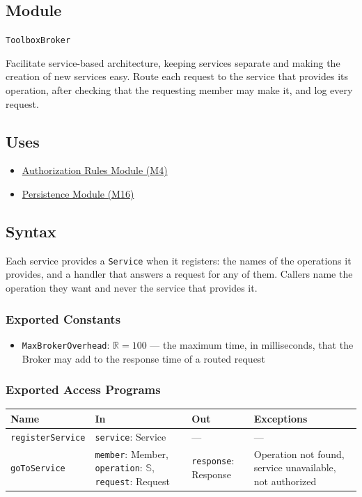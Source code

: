 \documentclass[12pt, titlepage]{article}
\begin{document}
\subsection{Module}
\texttt{ToolboxBroker}

Facilitate service-based architecture, keeping services separate and making the creation of new services easy. Route each request to the service that provides its operation, after checking that the requesting member may make it, and log every request.

\subsection{Uses}
\begin{itemize}
  \item \hyperref[mAuthz]{Authorization Rules Module (M4)}
  \item \hyperref[mPersist]{Persistence Module (M16)}
\end{itemize}

\subsection{Syntax}
Each service provides a \texttt{Service} when it registers: the names of the operations it provides, and a handler that answers a request for any of them. Callers name the operation they want and never the service that provides it.

\subsubsection{Exported Constants}
\begin{itemize}
  \item \texttt{MaxBrokerOverhead}: $\mathbb{R} = 100$ --- the maximum time, in milliseconds, that the Broker may add to the response time of a routed request
\end{itemize}

\subsubsection{Exported Access Programs}
\begin{tabularx}{\textwidth}{p{3.2cm} p{4.6cm} p{2.6cm} X}
\toprule
\textbf{Name} & \textbf{In} & \textbf{Out} & \textbf{Exceptions} \\
\midrule
\texttt{registerService} & \texttt{service}: Service & --- & --- \\
\texttt{goToService} & \texttt{member}: Member, \texttt{operation}: $\mathbb{S}$, \texttt{request}: Request & \texttt{response}: Response & Operation not found, service unavailable, not authorized \\
\bottomrule
\end{tabularx}
\end{document}
